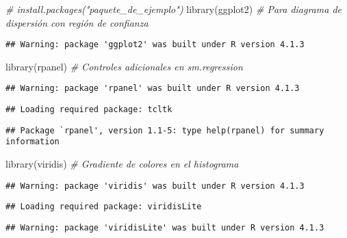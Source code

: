 \documentclass[
]{article}
\newenvironment{Shaded}{\begin{snugshade}}{\end{snugshade}}
\newcommand{\CommentTok}[1]{\textcolor[rgb]{0.56,0.35,0.01}{\textit{#1}}}
\newcommand{\FunctionTok}[1]{\textcolor[rgb]{0.00,0.00,0.00}{#1}}
\newcommand{\NormalTok}[1]{#1}
\begin{document}
\begin{Shaded}
\begin{Highlighting}[]
\CommentTok{\# install.packages("paquete\_de\_ejemplo")}
\FunctionTok{library}\NormalTok{(ggplot2)      }\CommentTok{\# Para diagrama de dispersión con región de confianza}
\end{Highlighting}
\end{Shaded}

\begin{verbatim}
## Warning: package 'ggplot2' was built under R version 4.1.3
\end{verbatim}

\begin{Shaded}
\begin{Highlighting}[]
\FunctionTok{library}\NormalTok{(rpanel)       }\CommentTok{\# Controles adicionales en sm.regression}
\end{Highlighting}
\end{Shaded}

\begin{verbatim}
## Warning: package 'rpanel' was built under R version 4.1.3
\end{verbatim}

\begin{verbatim}
## Loading required package: tcltk
\end{verbatim}

\begin{verbatim}
## Package `rpanel', version 1.1-5: type help(rpanel) for summary information
\end{verbatim}

\begin{Shaded}
\begin{Highlighting}[]
\FunctionTok{library}\NormalTok{(viridis)      }\CommentTok{\# Gradiente de colores en el histograma}
\end{Highlighting}
\end{Shaded}

\begin{verbatim}
## Warning: package 'viridis' was built under R version 4.1.3
\end{verbatim}

\begin{verbatim}
## Loading required package: viridisLite
\end{verbatim}

\begin{verbatim}
## Warning: package 'viridisLite' was built under R version 4.1.3
\end{verbatim}
\end{document}

